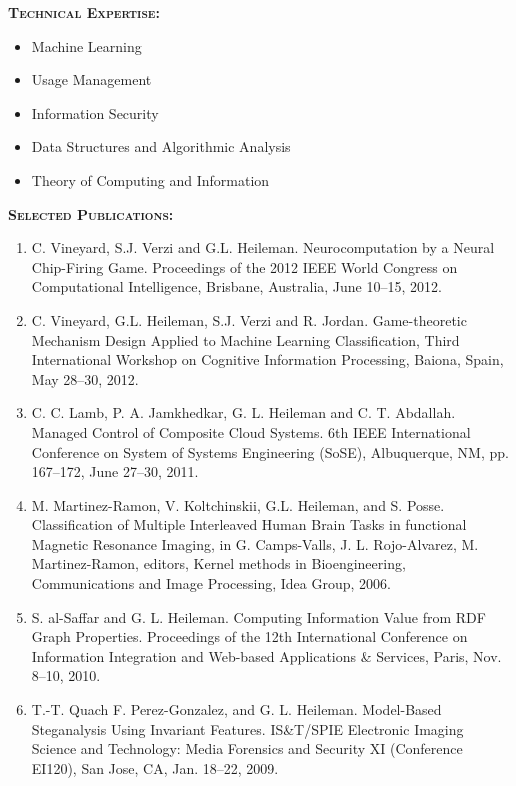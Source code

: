 \documentclass{sbir}
\begin{document}
{\vspace{-18pt}
{\textcolor{black}{\makebox[6.5in]{\hrulefill}} 
\textbf{\textsc{Technical Expertise:}}
\vspace{-8pt}
\begin{multicols}{2}
 \begin{itemize}
  \item Machine Learning
  \item Usage Management
  \item Information Security
  \item Data Structures and Algorithmic Analysis
  \item Theory of Computing and Information	
 \end{itemize}
\end{multicols}
\vspace{-12pt}
\textbf{\textsc{Selected Publications:}}
\vspace{-8pt}
\begin{enumerate}
\item C. Vineyard, S.J. Verzi and G.L. Heileman. Neurocomputation by a Neural Chip-Firing Game. Proceedings of the 2012 IEEE World Congress on Computational Intelligence, Brisbane, Australia, June 10--15, 2012.
\item C. Vineyard, G.L. Heileman, S.J. Verzi and R. Jordan. Game-theoretic Mechanism Design Applied to Machine Learning Classification, Third International Workshop on Cognitive Information Processing, Baiona, Spain, May 28--30, 2012.
\item C. C. Lamb, P. A. Jamkhedkar, G. L. Heileman and C. T. Abdallah. Managed Control of Composite Cloud Systems. 6th IEEE International Conference on System of Systems Engineering (SoSE), Albuquerque, NM, pp. 167--172, June 27--30, 2011.
\item M. Martinez-Ramon, V. Koltchinskii, G.L. Heileman, and S. Posse. Classification of Multiple Interleaved Human Brain Tasks in functional Magnetic Resonance Imaging, in G. Camps-Valls, J. L. Rojo-Alvarez, M. Martinez-Ramon, editors, Kernel methods in Bioengineering, Communications and Image Processing, Idea Group, 2006.
\item S. al-Saffar and G. L. Heileman. Computing Information Value from RDF Graph Properties. Proceedings of the 12th International Conference on Information Integration and Web-based Applications \& Services, Paris, Nov. 8--10, 2010.
\item T.-T. Quach F. Perez-Gonzalez, and G. L. Heileman. Model-Based Steganalysis Using Invariant Features. IS\&T/SPIE Electronic Imaging Science and Technology: Media Forensics and Security XI (Conference EI120), San Jose, CA, Jan. 18--22, 2009.

\end{enumerate}}}
\end{document}

